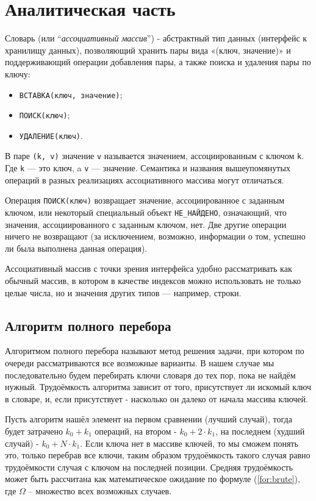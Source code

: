 \chapter{Аналитическая часть}

Словарь (или ``\textit{ассоциативный массив}'')\cite{dict} - абстрактный тип данных (интерфейс к хранилищу данных), позволяющий хранить пары вида «(ключ, значение)» и поддерживающий операции добавления пары, а также поиска и удаления пары по ключу:
\begin{itemize}
    \item \texttt{ВСТАВКА(ключ, значение)};
    \item \texttt{ПОИСК(ключ)};
    \item \texttt{УДАЛЕНИЕ(ключ)}.
\end{itemize}

В паре \texttt{(k, v)} значение \texttt{v} называется значением, ассоциированным с ключом \texttt{k}. Где \texttt{k} — это ключ, a \texttt{v} — значение. Семантика и названия вышеупомянутых операций в разных реализациях ассоциативного массива могут отличаться.

Операция \texttt{ПОИСК(ключ)} возвращает значение, ассоциированное с заданным ключом, или некоторый специальный объект \texttt{НЕ\_НАЙДЕНО}, означающий, что значения, ассоциированного с заданным ключом, нет. Две другие операции ничего не возвращают (за исключением, возможно, информации о том, успешно ли была выполнена данная операция).

Ассоциативный массив с точки зрения интерфейса удобно рассматривать как обычный массив, в котором в качестве индексов можно использовать не только целые числа, но и значения других типов — например, строки.

\section{Алгоритм полного перебора}

Алгоритмом полного перебора \cite{brute} называют метод решения задачи, при котором по очереди рассматриваются все возможные варианты. В нашем случае мы последовательно будем перебирать ключи словаря до тех пор, пока не найдём нужный. Трудоёмкость алгоритма зависит от того, присутствует ли искомый ключ в словаре, и, если присутствует - насколько он далеко от начала массива ключей.

Пусть алгоритм нашёл элемент на первом сравнении (лучший случай), тогда будет затрачено $k_0 + k_1$ операций, на втором - $k_0 + 2 \cdot k_1$, на последнем (худший случай) - $k_0 + N \cdot k_1$. Если ключа нет в массиве ключей, то мы сможем понять это, только перебрав все ключи, таким образом трудоёмкость такого случая равно трудоёмкости случая с ключом на последней позиции. Средняя трудоёмкость может быть рассчитана как математическое ожидание по формуле (\ref{for:brute}), где $\Omega$ -- множество всех возможных случаев.

